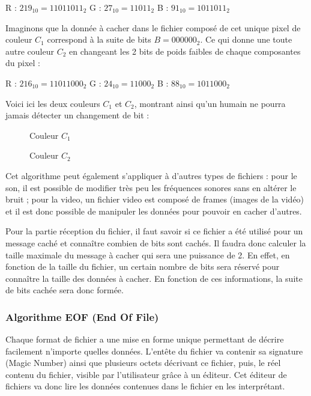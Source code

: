 \documentclass[11pt]{article}
\begin{document}
R : $219_{10} = 11011011_2$	\qquad G : $27_{10} = 11011_2$ \qquad B : $91_{10} = 1011011_2$


Imaginons que la donnée à cacher dans le fichier composé de cet unique pixel de couleur $C_1$ correspond à la suite de bits $B = 000000_2$.
Ce qui donne une toute autre couleur $C_2$ en changeant les 2 bits de poids faibles de chaque composantes du pixel : 

R : $216_{10} = 11011000_2$ \qquad G : $24_{10} = 11000_2$ \qquad B : $88_{10} = 1011000_2$


Voici ici les deux couleurs $C_1$ et $C_2$, montrant ainsi qu'un humain ne pourra jamais détecter un changement de bit : 

\begin{figure}[h]
 \begin{minipage}{.46\linewidth}
  \centering{}
  \caption{Couleur $C_1$}
 \end{minipage} \hfill
 \begin{minipage}{.46\linewidth}
  \centering{}
  \caption{Couleur $C_2$}
 \end{minipage}
\end{figure}

Cet algorithme peut également s'appliquer à d'autres types de fichiers : pour le son, il est possible de modifier très peu les fréquences sonores sans en altérer le bruit ; 
pour la video, un fichier video est composé de frames (images de la vidéo) et il est donc possible de manipuler les données pour pouvoir en cacher d'autres. 

Pour la partie réception du fichier, il faut savoir si ce fichier a été utilisé pour un message caché et connaître combien de bits sont cachés. 
Il faudra donc calculer la taille maximale du message à cacher qui sera une puissance de 2. En effet, en fonction de la taille du fichier, un certain nombre de bits sera réservé pour connaître la taille 
des données à cacher. 
En fonction de ces informations, la suite de bits cachée sera donc formée.

\subsubsection{Algorithme EOF (End Of File)}
Chaque format de fichier a une mise en forme unique permettant de décrire facilement n'importe quelles données. 
L'entête du fichier va contenir sa signature (Magic Number) ainsi que plusieurs octets décrivant ce fichier, puis, le réel contenu du fichier, visible par l'utilisateur grâce à un éditeur. 
Cet éditeur de fichiers va donc lire les données contenues dans le fichier en les interprétant. 
\end{document}
